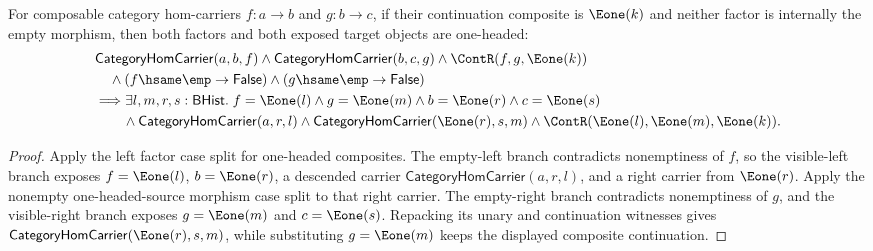 \begin{theorem}
\label{thm:category-hom-carrier-comp-nonempty-e1-morphism-factors}
For composable category hom-carriers $f:a\to b$ and $g:b\to c$, if their
continuation composite is $\Eone(k)$ and neither factor is internally the
empty morphism, then both factors and both exposed target objects are
one-headed:
$$
\begin{aligned}
&\mathsf{CategoryHomCarrier}(a,b,f)\land
\mathsf{CategoryHomCarrier}(b,c,g)\land
\ContR(f,g,\Eone(k))\\
&\quad\land (f\hsame\emp\to\mathsf{False})\land
(g\hsame\emp\to\mathsf{False})\\
&\Longrightarrow
\exists l,m,r,s:\mathsf{BHist}.\;
f=\Eone(l)\land g=\Eone(m)\land b=\Eone(r)\land c=\Eone(s)\\
&\qquad\land\mathsf{CategoryHomCarrier}(a,r,l)\land
\mathsf{CategoryHomCarrier}(\Eone(r),s,m)\land
\ContR(\Eone(l),\Eone(m),\Eone(k)).
\end{aligned}
$$
\end{theorem}
\begin{proof}
Apply the left factor case split for one-headed composites. The empty-left
branch contradicts nonemptiness of $f$, so the visible-left branch exposes
$f=\Eone(l)$, $b=\Eone(r)$, a descended carrier
$\mathsf{CategoryHomCarrier}(a,r,l)$, and a right carrier from $\Eone(r)$.
Apply the nonempty one-headed-source morphism case split to that right carrier.
The empty-right branch contradicts nonemptiness of $g$, and the visible-right
branch exposes $g=\Eone(m)$ and $c=\Eone(s)$. Repacking its unary and
continuation witnesses gives $\mathsf{CategoryHomCarrier}(\Eone(r),s,m)$, while
substituting $g=\Eone(m)$ keeps the displayed composite continuation.
\end{proof}

